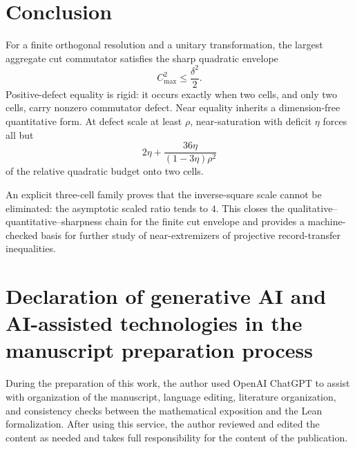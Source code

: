 \documentclass[11pt]{article}
\newcommand{\cmax}{C_{\max}}
\newcommand{\dd}{\delta}
\newcommand{\etaq}{\eta}
\begin{document}
\section{Conclusion}

For a finite orthogonal resolution and a unitary transformation, the
largest aggregate cut commutator satisfies the sharp quadratic envelope
\[
  \cmax^2\le\frac{\dd^2}{2}.
\]
Positive-defect equality is rigid: it occurs exactly when two cells, and only
two cells, carry nonzero commutator defect.  Near equality inherits a
dimension-free quantitative form.  At defect scale at least $\rho$,
near-saturation with deficit $\etaq$ forces all but
\[
  2\etaq+
  \frac{36\etaq}{(1-3\etaq)\rho^2}
\]
of the relative quadratic budget onto two cells.

An explicit three-cell family proves that the inverse-square scale cannot be
eliminated: the asymptotic scaled ratio tends to $4$.  This closes the
qualitative--quantitative--sharpness chain for the finite cut envelope and
provides a machine-checked basis for further study of near-extremizers of
projective record-transfer inequalities.

\section*{Declaration of generative AI and AI-assisted technologies in the manuscript preparation process}

During the preparation of this work, the author used OpenAI ChatGPT to assist
with organization of the manuscript, language editing, literature
organization, and consistency checks between the mathematical exposition and
the Lean formalization. After using this service, the author reviewed and
edited the content as needed and takes full responsibility for the content of
the publication.



\end{document}

